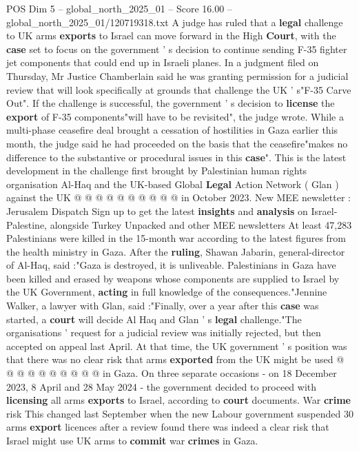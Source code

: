 \begin{textsample}{POS Dim 5 – global\_north\_2025\_01 – Score 16.00 – global\_north\_2025\_01/120719318.txt}  \label{ex:f5_pos_268}
A judge has ruled that a \textbf{legal} challenge to UK arms \textbf{exports} to Israel can move forward in the High \textbf{Court}, with the \textbf{case} set to focus on the government ' s decision to continue sending F-35 fighter jet components that could end up in Israeli planes.
In a judgment filed on Thursday, Mr Justice Chamberlain said he was granting permission for a judicial review that will look specifically at grounds that challenge the UK ' s"F-35 Carve Out".
If the challenge is successful, the government ' s decision to \textbf{license} the \textbf{export} of F-35 components"will have to be revisited", the judge wrote.
While a multi-phase ceasefire deal brought a cessation of hostilities in Gaza earlier this month, the judge said he had proceeded on the basis that the ceasefire"makes no difference to the substantive or procedural issues in this \textbf{case}".
This is the latest development in the challenge first brought by Palestinian human rights organisation Al-Haq and the UK-based Global \textbf{Legal} Action Network ( Glan ) against the UK @ @ @ @ @ @ @ @ @ @ in October 2023.
New MEE newsletter : Jerusalem Dispatch Sign up to get the latest \textbf{insights} and \textbf{analysis} on Israel-Palestine, alongside Turkey Unpacked and other MEE newsletters At least 47,283 Palestinians were killed in the 15-month war according to the latest figures from the health ministry in Gaza.
After the \textbf{ruling}, Shawan Jabarin, general-director of Al-Haq, said :"Gaza is destroyed, it is unliveable.
Palestinians in Gaza have been killed and erased by weapons whose components are supplied to Israel by the UK Government, \textbf{acting} in full knowledge of the consequences."Jennine Walker, a lawyer with Glan, said :"Finally, over a year after this \textbf{case} was started, a \textbf{court} will decide Al Haq and Glan ' s \textbf{legal} challenge."The organisations ' request for a judicial review was initially rejected, but then accepted on appeal last April.
At that time, the UK government ' s position was that there was no clear risk that arms \textbf{exported} from the UK might be used @ @ @ @ @ @ @ @ @ @ in Gaza.
On three separate occasions - on 18 December 2023, 8 April and 28 May 2024 - the government decided to proceed with \textbf{licensing} all arms \textbf{exports} to Israel, according to \textbf{court} documents.
War \textbf{crime} risk This changed last September when the new Labour government suspended 30 arms \textbf{export} licences after a review found there was indeed a clear risk that Israel might use UK arms to \textbf{commit} war \textbf{crimes} in Gaza.

\end{textsample}

